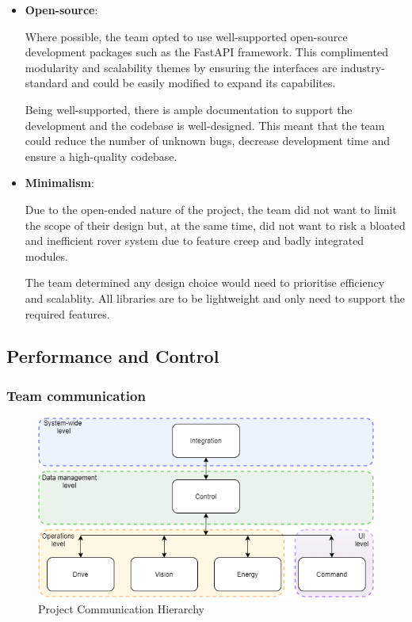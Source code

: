 \documentclass[11pt, a4paper]{article}
\begin{document}
\begin{itemize}
    \item \textbf{Open-source}: 
    
    Where possible, the team opted to use well-supported open-source development packages such as the FastAPI framework. This complimented modularity and scalability themes by ensuring the interfaces are industry-standard and could be easily modified to expand its capabilites. 
    
    Being well-supported, there is ample documentation to support the development and the codebase is well-designed. This meant that the team could reduce the number of unknown bugs, decrease development time and ensure a high-quality codebase.     

    \item \textbf{Minimalism}:
    
    Due to the open-ended nature of the project, the team did not want to limit the scope of their design but, at the same time, did not want to risk a bloated and inefficient rover system due to feature creep and badly integrated modules. 
    
    The team determined any design choice would need to prioritise efficiency and scalablity. All libraries are to be lightweight and only need to support the required features. 
    
\end{itemize}

\vfill

\pagebreak
\subsection{Performance and Control}

\subsubsection{Team communication}

\begin{figure} [h!]
    \centering
    \includegraphics[scale=0.4]{Comms.png}
    \caption{Project Communication Hierarchy}
\end{figure}
\end{document}
